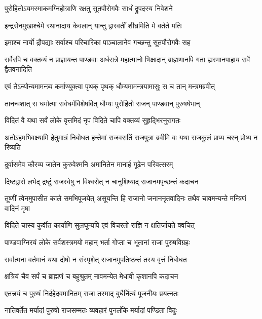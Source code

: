 \twolineshloka
{पुरोहितोऽयमस्माकमग्निहोत्राणि रक्षतु}
{सूतपौरोगवैः सार्धं द्रुपदस्य निवेशने}


\twolineshloka
{इन्द्रसेनमुखाश्चेमे रथानादाय केवलान्}
{यान्तु द्वारवतीं शीघ्रमिति मे वर्तते मतिः}


\twolineshloka
{इमाश्च नार्यो द्रौपद्याः सर्वाश्च परिचारिका}
{पाञ्चालानेव गच्छन्तु सूतपौरोगवैः सह}


\threelineshloka
{सर्वैरपि च वक्तव्यं न प्राज्ञायन्त पाण्डवाः}
{अर्धरात्रे महात्मानो भिक्षादान् ब्राह्मणानपि}
{गता ह्यस्मानपाहाय सर्वे द्वैतवनादिति}



\twolineshloka
{एवं तेऽन्योन्यमामन्त्र्य कर्माण्युक्त्वा पृथक् पृथक्}
{धौम्यमामन्त्रयामासुः स च तान् मन्त्रमब्रवीत्}


\twolineshloka
{तानन्वशात् स धर्मात्मा सर्वधर्मविशेषवित्}
{धौम्यः पुरोहितो राजन् पाण्डवान् पुरुषर्षभान्}




\twolineshloka
{विदितं वै यथा सर्वं लोके वृत्तमिदं नृप}
{विदिते चापि वक्तव्यं सुहृद्भिरनुरागतः}


\threelineshloka
{अतोऽहमभिवक्ष्यामि हेतुमात्रं निबोधत}
{हन्तेमां राजवसतिं राजपुत्रा ब्रवीमि वः}
{यथा राजकुलं प्राप्य चरन् प्रोष्य न रिष्यति}


\twolineshloka
{दुर्वासमेव कौरव्य जातेन कुरुवेश्मनि}
{अमानितेन मानार्ह गूढेन परिवत्सरम्}


\twolineshloka
{दिष्टद्वारो लभेद् द्रष्टुं राजस्वेषु न विश्वसेत्}
{न चानुशिष्याद् राजानमपृच्छन्तं कदाचन}


\onelineshloka
{तूष्णीं त्वेनमुपासीत काले समभिपूजयेत्}
\twolineshloka
{असूयन्ति हि राजानो जनाननृतवादिनः}
{तथैव चावमन्यन्ते मन्त्रिणं वादिनं मृषा}


\twolineshloka
{विदिते चास्य कुर्वीत कार्याणि सुलघून्यपि}
{एवं विचरतो राज्ञि न क्षतिर्जायते क्वचित्}


\twolineshloka
{पाण्डवाग्निरयं लोके सर्वशस्त्रमयो महान्}
{भर्ता गोप्ता च भूतानां राजा पुरुषविग्रहः}


\twolineshloka
{सर्वात्मना वर्तमानं यथा दोषो न संस्पृशेत्}
{राजानमुपतिष्ठन्तं तस्य वृत्तं निबोधत}


\twolineshloka
{क्षत्रियं चैव सर्पं च ब्राह्मणं च बहुश्रुतम्}
{नावमन्येत मेधावी कृशानपि कदाचन}


\twolineshloka
{एतत्त्रयं च पुरुषं निर्दहेदवमानितम्}
{राजा तस्माद् बुधैर्नित्यं पूजनीयः प्रयत्नतः}


\twolineshloka
{नातिवर्तेत मर्यादां पुरुषो राजसम्मतः}
{व्यवहारं पुनर्लोके मर्यादां पण्डिता विदुः}


